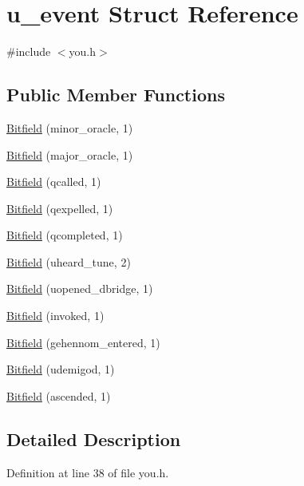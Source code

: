 \hypertarget{structu__event}{\section{u\+\_\+event Struct Reference}
\label{structu__event}
}


{\ttfamily \#include $<$you.\+h$>$}

\subsection*{Public Member Functions}
\begin{DoxyCompactItemize}
\item 
\hyperlink{structu__event_aedc9402c0a67c2c4617ab34acc9f3e78}{Bitfield} (minor\+\_\+oracle, 1)
\item 
\hyperlink{structu__event_a7bc4cd8c94dcb6f9a5e545f70ccc48af}{Bitfield} (major\+\_\+oracle, 1)
\item 
\hyperlink{structu__event_ad32d8f3850c9ced7696bba89f5603ac1}{Bitfield} (qcalled, 1)
\item 
\hyperlink{structu__event_ad3126430ee4c2a8525d18656f33290dc}{Bitfield} (qexpelled, 1)
\item 
\hyperlink{structu__event_a5c275d85a44395fb4b2ff0abdd25a5f6}{Bitfield} (qcompleted, 1)
\item 
\hyperlink{structu__event_aa39bc9381bb0a6fcd5acbe2043043b1f}{Bitfield} (uheard\+\_\+tune, 2)
\item 
\hyperlink{structu__event_a054befefeb5a18e06d712a4bf405b801}{Bitfield} (uopened\+\_\+dbridge, 1)
\item 
\hyperlink{structu__event_ab33bd9cbec6e0dc0e23cb43cc74d93ad}{Bitfield} (invoked, 1)
\item 
\hyperlink{structu__event_ad224545e7f4b5bf4e65e745432711f8c}{Bitfield} (gehennom\+\_\+entered, 1)
\item 
\hyperlink{structu__event_a66b2b5fadd3c5ead13b8edab9546d18a}{Bitfield} (udemigod, 1)
\item 
\hyperlink{structu__event_a626326509c7737575dfead80df40d324}{Bitfield} (ascended, 1)
\end{DoxyCompactItemize}


\subsection{Detailed Description}


Definition at line 38 of file you.\+h.




